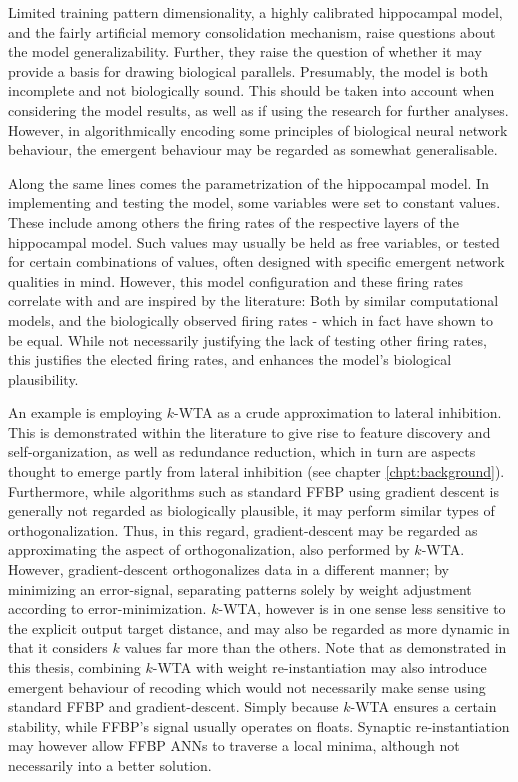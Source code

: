 

Limited training pattern dimensionality, a highly calibrated hippocampal model, and the fairly artificial memory consolidation mechanism, raise questions about the model generalizability. Further, they raise the question of whether it may provide a basis for drawing biological parallels.
Presumably, the model is both incomplete and not biologically sound. This should be taken into account when considering the model results, as well as if using the research for further analyses. However, in algorithmically encoding some principles of biological neural network behaviour, the emergent behaviour may be regarded as somewhat generalisable.

Along the same lines comes the parametrization of the hippocampal model. In implementing and testing the model, some variables were set to constant values. These include among others the firing rates of the respective layers of the hippocampal model. Such values may usually be held as free variables, or tested for certain combinations of values, often designed with specific emergent network qualities in mind. However, this model configuration and these firing rates correlate with and are inspired by the literature: Both by similar computational models, and the biologically observed firing rates - which in fact have shown to be equal. While not necessarily justifying the lack of testing other firing rates, this justifies the elected firing rates, and enhances the model's biological plausibility.

An example is employing $k$-WTA as a crude approximation to lateral inhibition. This is demonstrated within the literature to give rise to feature discovery and self-organization, as well as redundance reduction, which in turn are aspects thought to emerge partly from lateral inhibition (see chapter \ref{chpt:background}).
Furthermore, while algorithms such as standard FFBP using gradient descent is generally not regarded as biologically plausible, it may perform similar types of orthogonalization. Thus, in this regard, gradient-descent may be regarded as approximating the aspect of orthogonalization, also performed by $k$-WTA. However, gradient-descent orthogonalizes data in a different manner; by minimizing an error-signal, separating patterns solely by weight adjustment according to error-minimization. $k$-WTA, however is in one sense less sensitive to the explicit output target distance, and may also be regarded as more dynamic in that it considers $k$ values far more than the others. Note that as demonstrated in this thesis, combining $k$-WTA with weight re-instantiation may also introduce emergent behaviour of recoding which would not necessarily make sense using standard FFBP and gradient-descent. Simply because $k$-WTA ensures a certain stability, while FFBP's signal usually operates on floats. Synaptic re-instantiation may however allow FFBP ANNs to traverse a local minima, although not necessarily into a better solution.


